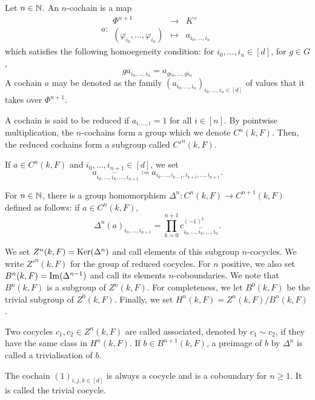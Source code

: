 \begin{definition}
    Let \(n \in \mathbb{N}\). An \(n\)-cochain is a map \[a:\begin{array}{ccl} \Phi^{n+1} &\to &K^\times \\ (\varphi_{i_0},\hdots,\varphi_{i_n}) &\mapsto &a_{i_0,\hdots,i_n}\end{array}\] which satisfies the following homoegeneity condition: for \(i_0,\hdots,i_n \in [d]\), for \(g \in G\),
    \begin{equation} \label{eq:homogeneity}
        ga_{i_0,\hdots,i_n} = a_{gi_0,\hdots,gi_n}
    \end{equation}
    A cochain \(a\) may be denoted as the family \((a_{i_0,\hdots,i_n})_{i_0,\hdots,i_n \in [d]}\) of values that it takes over \(\Phi^{n+1}\).

    A cochain is said to be reduced if \(a_{i,\hdots,i} = 1\) for all \(i \in [n]\).
    By pointwise multiplication, the \(n\)-cochains form a group which we denote \(C^n(k,F)\). Then, the reduced cochains form a subgroup called \(C'^n(k,F)\).

    If \(a \in C^n(k,F)\) and \(i_0,\hdots,i_{n+1} \in [d]\), we set \[a_{i_0,\hdots,\widehat{i_k},\hdots,i_{n+1}} \coloneqq a_{i_0,\hdots,i_{k-1},i_{k+1},\hdots,i_{n+1}}.\]

    For \(n \in \mathbb{N}\), there is a group homomorphism \(\Delta^n \colon C^n(k,F) \to C^{n+1}(k,F)\) defined as follows: if \(a \in C^n(k,F)\),
    \[\Delta^n(a)_{i_0,\hdots,i_{n+1}} = \prod_{k=0}^{n+1} c_{i_0,\hdots,\widehat{i_k},\hdots,i_n}^{(-1)^k}.\]

    We set \(Z^n(k,F) = \operatorname{Ker}(\Delta^n)\) and call elements of this subgroup \(n\)-cocycles. We write \(Z'^n(k,F)\) for the group of reduced cocycles. For \(n\) positive, we also set \(B^n(k,F) = \operatorname{Im}(\Delta^{n-1})\) and call its elements \(n\)-coboundaries. We note that \(B^n(k,F)\) is a subgroup of \(Z^n(k,F)\). For completeness, we let \(B^0(k,F)\) be the trivial subgroup of \(Z^0(k,F)\). Finally, we set \(H^n(k,F) = Z^n(k,F)/B^n(k,F)\).

    Two cocycles \(c_1,c_2 \in Z^n(k,F)\) are called associated, denoted by \(c_1 \sim c_2\), if they have the same class in \(H^n(k,F)\). If \(b \in B^{n+1}(k,F)\), a preimage of \(b\) by \(\Delta^n\) is called a trivialisation of \(b\).
\end{definition}

\begin{remark}
    The cochain \((1)_{i,j,k \in [d]}\) is always a cocycle and is a coboundary for \(n \geq 1\). It is called the trivial cocycle.
\end{remark}

